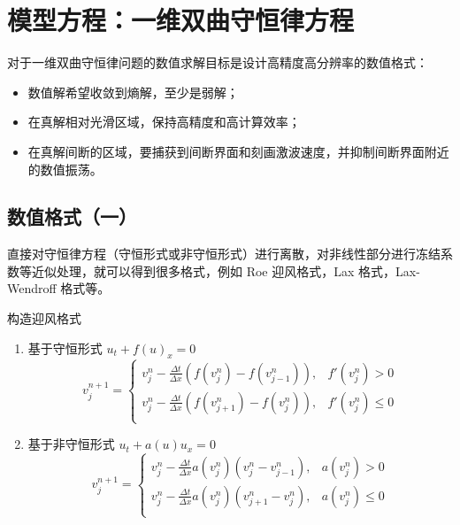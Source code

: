 \chapter{模型方程：一维双曲守恒律方程}


对于一维双曲守恒律问题的数值求解目标是设计高精度高分辨率的数值格式：
\begin{itemize}
    \item 数值解希望收敛到熵解，至少是弱解；
    \item 在真解相对光滑区域，保持高精度和高计算效率；
    \item 在真解间断的区域，要捕获到间断界面和刻画激波速度，并抑制间断界面附近的数值振荡。
\end{itemize}


\section{数值格式（一）}

直接对守恒律方程（守恒形式或非守恒形式）进行离散，对非线性部分进行冻结系数等近似处理，就可以得到很多格式，例如 Roe 迎风格式，Lax 格式，Lax-Wendroff 格式等。
\begin{example}
    构造迎风格式
    \begin{enumerate}
        \item 基于守恒形式 $u_t + f(u)_x = 0$
              \[
                  v_j^{n+1} =
                  \begin{cases}
                      v_j^n - \frac{\Delta t}{\Delta x}\left(f(v_{j}^n)-f(v_{j-1}^n)\right), & f'(v_j^n) > 0   \\
                      v_j^n - \frac{\Delta t}{\Delta x}\left(f(v_{j+1}^n)-f(v_{j}^n)\right), & f'(v_j^n) \le 0 \\
                  \end{cases}
              \]
        \item 基于非守恒形式 $u_t + a(u) u_x = 0$
              \[
                  v_j^{n+1} =
                  \begin{cases}
                      v_j^n - \frac{\Delta t}{\Delta x} a(v_j^n) \left(v_{j}^n-v_{j-1}^n\right), & a(v_j^n) > 0   \\
                      v_j^n - \frac{\Delta t}{\Delta x} a(v_j^n) \left(v_{j+1}^n-v_{j}^n\right), & a(v_j^n) \le 0 \\
                  \end{cases}
              \]
    \end{enumerate}
\end{example}


